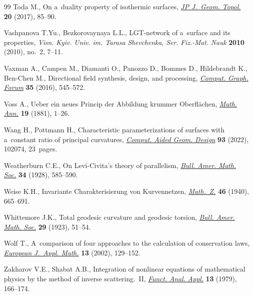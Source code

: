 \documentclass[pdftex]{sigma}
\numberwithin{equation}{section}
\begin{document}
\begin{thebibliography}{99}
Toda M., On a~duality property of isothermic surfaces, \href{https://doi.org/10.17654/GT020010085}{\textit{JP J.~Geom.
  Topol.}} \textbf{20} (2017), 85--90.

Vashpanova T.Yu., Bezkorovaynaya L.L., LGT-network of a~surface and its
  properties, \textit{Visn. Kyiv. Univ. im. Tarasa Shevchenka, Ser. Fiz.-Mat.
  Nauk} \textbf{2010} (2010), no.~2, 7--11.

Vaxman A., Campen M., Diamanti O., Panozzo D., Bommes D., Hildebrandt K.,
  Ben-Chen M., Directional field synthesis, design, and processing,
  \href{https://doi.org/10.1111/cgf.12864}{\textit{Comput. Graph. Forum}} \textbf{35} (2016), 545--572.

Voss A., Ueber ein neues {P}rincip der {A}bbildung krummer {O}berfl\"achen,
  \href{https://doi.org/10.1007/BF01447291}{\textit{Math. Ann.}} \textbf{19} (1881), 1--26.

Wang H., Pottmann H., Characteristic parameterizations of surfaces with
  a~constant ratio of principal curvatures, \href{https://doi.org/10.1016/j.cagd.2022.102074}{\textit{Comput. Aided Geom. Design}}
  \textbf{93} (2022), 102074, 23~pages.

Weatherburn C.E., On {L}evi-{C}ivita's theory of parallelism, \href{https://doi.org/10.1090/S0002-9904-1928-04629-3}{\textit{Bull.
  Amer. Math. Soc.}} \textbf{34} (1928), 585--590.

Weise K.H., Invariante {C}harakterisierung von {K}urvennetzen,
  \href{https://doi.org/10.1007/BF01181462}{\textit{Math.~Z.}} \textbf{46} (1940), 665--691.

Whittemore J.K., Total geodesic curvature and geodesic torsion, \href{https://doi.org/10.1090/S0002-9904-1923-03659-8}{\textit{Bull.
  Amer. Math. Soc.}} \textbf{29} (1923), 51--54.

Wolf T., A~comparison of four approaches to the calculation of conservation
  laws, \href{https://doi.org/10.1017/S0956792501004715}{\textit{European J.~Appl. Math.}} \textbf{13} (2002), 129--152.

Zakharov V.E., Shabat A.B., Integration of nonlinear equations of
  mathematical physics by the method of inverse scattering.~{II},
  \href{https://doi.org/10.1007/BF01077483}{\textit{Funct. Anal. Appl.}} \textbf{13} (1979), 166--174.

\end{thebibliography}\LastPageEnding
\end{document}
